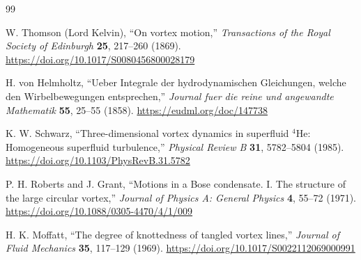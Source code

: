 \begin{thebibliography}{99}

W. Thomson (Lord Kelvin),
``On vortex motion,''
\emph{Transactions of the Royal Society of Edinburgh} \textbf{25}, 217--260 (1869).
\url{https://doi.org/10.1017/S0080456800028179}

H. von Helmholtz,
``Ueber Integrale der hydrodynamischen Gleichungen, welche den Wirbelbewegungen entsprechen,''
\emph{Journal fuer die reine und angewandte Mathematik} \textbf{55}, 25--55 (1858).
\url{https://eudml.org/doc/147738}

K. W. Schwarz,
``Three-dimensional vortex dynamics in superfluid $^4$He: Homogeneous superfluid turbulence,''
\emph{Physical Review B} \textbf{31}, 5782--5804 (1985).
\url{https://doi.org/10.1103/PhysRevB.31.5782}

P. H. Roberts and J. Grant,
``Motions in a Bose condensate. I. The structure of the large circular vortex,''
\emph{Journal of Physics A: General Physics} \textbf{4}, 55--72 (1971).
\url{https://doi.org/10.1088/0305-4470/4/1/009}

H. K. Moffatt,
``The degree of knottedness of tangled vortex lines,''
\emph{Journal of Fluid Mechanics} \textbf{35}, 117--129 (1969).
\url{https://doi.org/10.1017/S0022112069000991}

\end{thebibliography}
